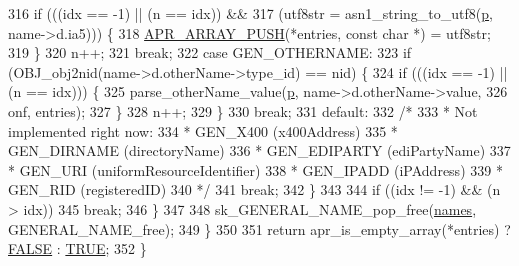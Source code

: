 \begin{DoxyCode}
316                 \textcolor{keywordflow}{if} (((idx == -1) || (n == idx)) &&
317                     (utf8str = asn1\_string\_to\_utf8(\hyperlink{group__APACHE__CORE__MPM_ga5cd91701e5c167f2b1a38e70ab57817e}{p}, name->d.ia5))) \{
318                     \hyperlink{group__apr__tables_ga1833b0f940ec03d0b95926812152e1ca}{APR\_ARRAY\_PUSH}(*entries, \textcolor{keyword}{const} \textcolor{keywordtype}{char} *) = utf8str;
319                 \}
320                 n++;
321                 \textcolor{keywordflow}{break};
322             \textcolor{keywordflow}{case} GEN\_OTHERNAME:
323                 \textcolor{keywordflow}{if} (OBJ\_obj2nid(name->d.otherName->type\_id) == nid) \{
324                     \textcolor{keywordflow}{if} (((idx == -1) || (n == idx))) \{
325                         parse\_otherName\_value(\hyperlink{group__APACHE__CORE__MPM_ga5cd91701e5c167f2b1a38e70ab57817e}{p}, name->d.otherName->value,
326                                               onf, entries);
327                     \}
328                     n++;
329                 \}
330                 \textcolor{keywordflow}{break};
331             \textcolor{keywordflow}{default}:
332                 \textcolor{comment}{/*}
333 \textcolor{comment}{                 * Not implemented right now:}
334 \textcolor{comment}{                 * GEN\_X400 (x400Address)}
335 \textcolor{comment}{                 * GEN\_DIRNAME (directoryName)}
336 \textcolor{comment}{                 * GEN\_EDIPARTY (ediPartyName)}
337 \textcolor{comment}{                 * GEN\_URI (uniformResourceIdentifier)}
338 \textcolor{comment}{                 * GEN\_IPADD (iPAddress)}
339 \textcolor{comment}{                 * GEN\_RID (registeredID)}
340 \textcolor{comment}{                 */}
341                 \textcolor{keywordflow}{break};
342             \}
343 
344             \textcolor{keywordflow}{if} ((idx != -1) && (n > idx))
345                \textcolor{keywordflow}{break};
346         \}
347 
348         sk\_GENERAL\_NAME\_pop\_free(\hyperlink{ap__regex_8h_aba891871049c2a2e93d20a094a56662a}{names}, GENERAL\_NAME\_free);
349     \}
350 
351     \textcolor{keywordflow}{return} apr\_is\_empty\_array(*entries) ? \hyperlink{group__MOD__SSL__PRIVATE_gaa93f0eb578d23995850d61f7d61c55c1}{FALSE} : \hyperlink{group__MOD__SSL__PRIVATE_gaa8cecfc5c5c054d2875c03e77b7be15d}{TRUE};
352 \}
\end{DoxyCode}


